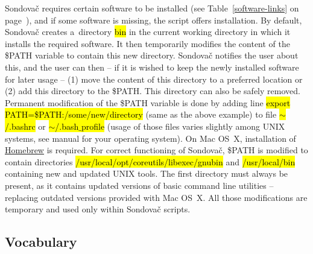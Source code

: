 \documentclass[a4paper, 11pt, twoside]{article}
\renewcommand{\texttt}[1]{\hl{\ttfamily #1}}
\begin{document}
Sondovač requires certain software to be installed (see Table~\ref{software-links} on page~\pageref{software-links}), and if some software is missing, the script offers installation. By default, Sondovač creates a~directory \texttt{bin} in the current working directory in which it installs the required software. It then temporarily modifies the content of the \$PATH variable to contain this new directory. Sondovač notifies the user about this, and the user can then -- if it is wished to keep the newly installed software for later usage -- (1) move the content of this directory to a preferred location or (2) add this directory to the \$PATH. This directory can also be safely removed. Permanent modification of the \$PATH variable is done by adding line \texttt{export PATH=\$PATH:/some/new/directory} (same as the above example) to file \texttt{$\sim$/.bashrc} or \texttt{$\sim$/.bash$\_$profile} (usage of those files varies slightly among UNIX systems, see manual for your operating system). On Mac OS~X, installation of \href{http://brew.sh/}{Homebrew} is required. For correct functioning of Sondovač, \$PATH is modified to contain directories \texttt{/usr/local/opt/coreutils/libexec/gnubin} and \texttt{/usr/local/bin} containing new and updated UNIX tools. The first directory must always be present, as it contains updated versions of basic command line utilities -- replacing outdated versions provided with Mac OS~X. All those modifications are temporary and used only within Sondovač scripts.

\subsection{Vocabulary}
\label{vocabulary}
\end{document}
